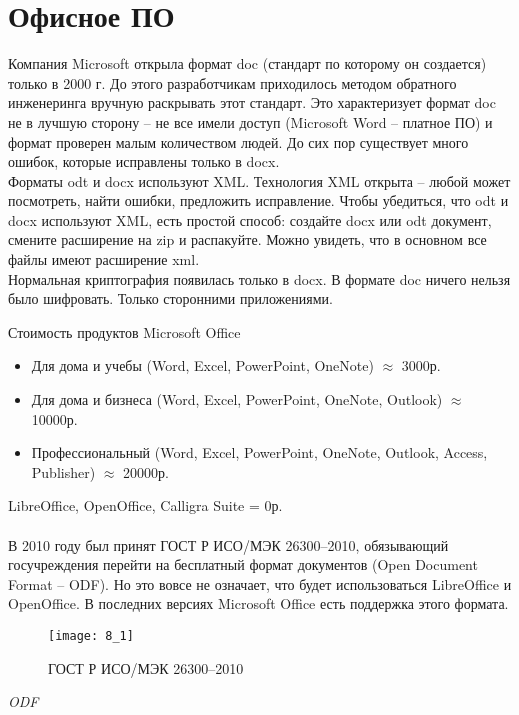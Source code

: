 \section{Офисное ПО}
Компания Microsoft открыла формат doc (стандарт по которому он создается) только в 2000 г. До этого разработчикам приходилось методом обратного инженеринга вручную раскрывать этот стандарт. Это характеризует формат doc не в лучшую сторону -- не все имели доступ (Microsoft Word -- платное ПО) и формат проверен малым количеством людей. До сих пор существует много ошибок, которые исправлены только в docx.
\\Форматы odt и docx используют XML. Технология XML открыта -- любой может посмотреть, найти ошибки, предложить исправление. Чтобы убедиться, что odt и docx используют XML, есть простой способ: создайте docx или odt документ, смените расширение на zip и распакуйте. Можно увидеть, что в основном все файлы имеют расширение xml.
\\Нормальная криптография появилась только в docx. В формате doc ничего нельзя было шифровать. Только сторонними приложениями.
\\
\begin{center}
Стоимость продуктов Microsoft Office
\end{center}
\begin{itemize}
  \item Для дома и учебы (Word, Excel, PowerPoint, OneNote) $\approx$ 3000р.
  \item Для дома и бизнеса (Word, Excel, PowerPoint, OneNote, Outlook) $\approx$ 10000р.
  \item Профессиональный (Word, Excel, PowerPoint, OneNote, Outlook, Access, Publisher) $\approx$ 20000р.
\end{itemize}
LibreOffice, OpenOffice, Calligra Suite = 0р.
\\
\\В 2010 году был принят ГОСТ Р ИСО/МЭК 26300--2010, обязывающий госучреждения перейти на бесплатный формат документов (Open Document Format -- ODF). Но это вовсе не означает, что будет использоваться LibreOffice и OpenOffice. В последних версиях Microsoft Office есть поддержка этого формата.
\begin{figure}
\texttt{[image: 8\_1]}
\caption{ГОСТ Р ИСО/МЭК 26300--2010}
\end{figure}
\begin{center}
\emph{ ODF}
\end{center}

